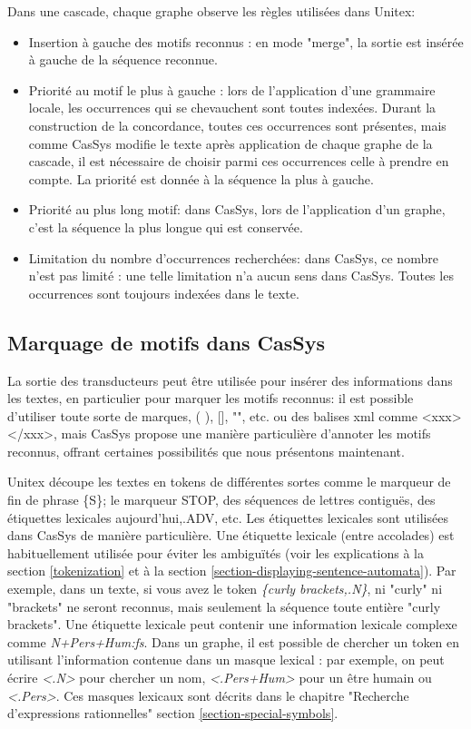 Dans une cascade, chaque graphe observe les règles utilisées dans Unitex:
\begin{itemize}
	\item Insertion à gauche des motifs reconnus : en mode "merge", la sortie est insérée à
	gauche de la séquence reconnue.
	\item	Priorité au motif le plus à gauche : lors de l'application d'une grammaire locale,
	les occurrences qui se chevauchent sont toutes indexées. 
	Durant la construction de la concordance, toutes ces occurrences sont présentes, mais comme CasSys
	modifie le texte après application de chaque 
	graphe de la cascade, il est nécessaire de choisir parmi ces occurrences celle à prendre en
	compte. La priorité est donnée à la séquence la plus à gauche.
	\item Priorité au plus long motif: dans CasSys, lors de l'application d'un graphe, c'est la
	séquence la plus longue qui est conservée.
	\item	Limitation du nombre d'occurrences recherchées: dans CasSys, ce nombre n'est pas
	limité : une telle limitation n'a aucun sens dans CasSys. Toutes les occurrences sont
	toujours indexées dans le texte.
\end{itemize}

\subsection{Marquage de motifs dans CasSys}

La sortie des transducteurs peut être utilisée pour insérer des informations dans les textes, en
particulier pour marquer les motifs reconnus: il est possible d'utiliser toute sorte de marques, 
( ), [], "", etc. ou des balises xml comme <xxx> </xxx>, mais CasSys propose une manière
particulière d'annoter les motifs reconnus, offrant certaines possibilités que nous présentons
maintenant.  

\bigskip
\noindent Unitex découpe les textes en tokens de différentes sortes comme le marqueur de fin de
phrase \{S\}; le marqueur {STOP}, des séquences de lettres contiguës, des étiquettes lexicales
{aujourd'hui,.ADV}, etc. Les étiquettes lexicales sont utilisées dans CasSys de manière
particulière. Une étiquette lexicale (entre accolades) est habituellement utilisée pour éviter les
ambiguïtés (voir les explications à la section \ref{tokenization} et à la section
\ref{section-displaying-sentence-automata}). 
Par exemple, dans un texte, si vous avez le token \emph{\{curly brackets,.N\}}, ni "curly" ni
"brackets" ne seront reconnus, mais seulement la séquence toute entière
"curly brackets". Une étiquette lexicale peut contenir une information lexicale complexe comme
\emph{N+Pers+Hum:fs}.
Dans un graphe, il est possible de chercher un token en utilisant l'information contenue dans un
masque lexical : par exemple, on peut écrire \emph{<.N>} pour chercher 
un nom, \emph{<.Pers+Hum>} pour un être humain ou \emph{<.Pers>}. Ces masques lexicaux sont décrits
dans le chapitre "Recherche d'expressions rationnelles" section
\ref{section-special-symbols}.
 
